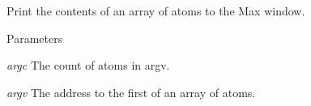 Print the contents of an array of atoms to the Max window. 
\begin{DoxyParams}{Parameters}
\item[{\em argc}]The count of atoms in argv. \item[{\em argv}]The address to the first of an array of atoms. \end{DoxyParams}
